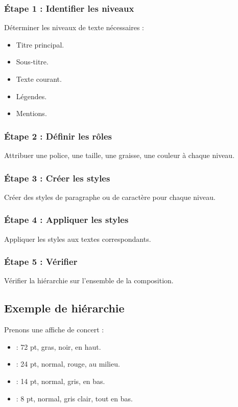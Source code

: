 \subsubsection{Étape 1 : Identifier les niveaux}

Déterminer les niveaux de texte nécessaires :

\begin{itemize}
    \item Titre principal.
    \item Sous-titre.
    \item Texte courant.
    \item Légendes.
    \item Mentions.
\end{itemize}

\subsubsection{Étape 2 : Définir les rôles}

Attribuer une police, une taille, une graisse, une couleur à chaque niveau.

\subsubsection{Étape 3 : Créer les styles}

Créer des styles de paragraphe ou de caractère pour chaque niveau.

\subsubsection{Étape 4 : Appliquer les styles}

Appliquer les styles aux textes correspondants.

\subsubsection{Étape 5 : Vérifier}

Vérifier la hiérarchie sur l'ensemble de la composition.

\subsection{Exemple de hiérarchie}

Prenons une affiche de concert :

\begin{itemize}
    \item {} : 72 pt, gras, noir, en haut.
    \item {} : 24 pt, normal, rouge, au milieu.
    \item {} : 14 pt, normal, gris, en bas.
    \item {} : 8 pt, normal, gris clair, tout en bas.
\end{itemize}

